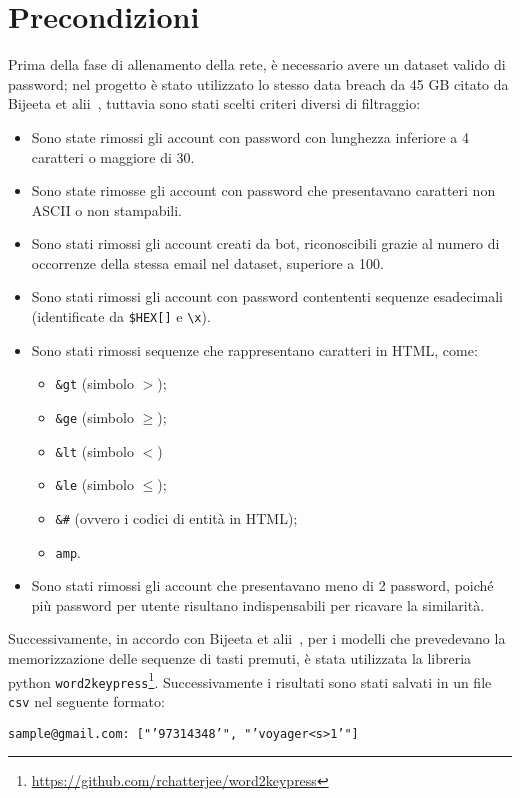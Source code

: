 \section{Precondizioni}
\label{sec:precondizioni}
Prima della fase di allenamento della rete, è necessario avere un dataset valido di password; nel progetto è stato utilizzato lo stesso data breach da 45 GB citato da Bijeeta et alii~\cite{bijeeta}, tuttavia sono stati scelti criteri diversi di filtraggio:
\begin{itemize}
    \item Sono state rimossi gli account con password con lunghezza inferiore a 4 caratteri o maggiore di 30.
    \item Sono state rimosse gli account con password che presentavano caratteri non ASCII o non stampabili.
    \item Sono stati rimossi gli account creati da bot, riconoscibili grazie al numero di occorrenze della stessa email nel dataset, superiore a 100.
    \item Sono stati rimossi gli account con password contententi sequenze esadecimali (identificate da \texttt{\$HEX[]} e \texttt{\textbackslash x}).
    \item Sono stati rimossi sequenze che rappresentano caratteri in HTML, come:
    \begin{itemize}
        \item \texttt{\&gt} (simbolo $>$);
        \item \texttt{\&ge} (simbolo $\geq$);
        \item \texttt{\&lt} (simbolo $<$)
        \item \texttt{\&le} (simbolo $\leq$);
        \item \texttt{\&\#} (ovvero i codici di entità in HTML);
        \item \texttt{amp}.
    \end{itemize}
    \item Sono stati rimossi gli account che presentavano meno di 2 password, poiché più password per utente risultano indispensabili per ricavare la similarità.
\end{itemize}
Successivamente, in accordo con Bijeeta et alii~\cite{bijeeta}, per i modelli che prevedevano la memorizzazione delle sequenze di tasti premuti, è stata utilizzata la libreria python \texttt{word2keypress}\footnote{\url{https://github.com/rchatterjee/word2keypress}}.
Successivamente i risultati sono stati salvati in un file \texttt{csv} nel seguente formato:
\begin{center}
    \texttt{sample@gmail.com: ["'97314348'", "'voyager<s>1'"]}
\end{center}

